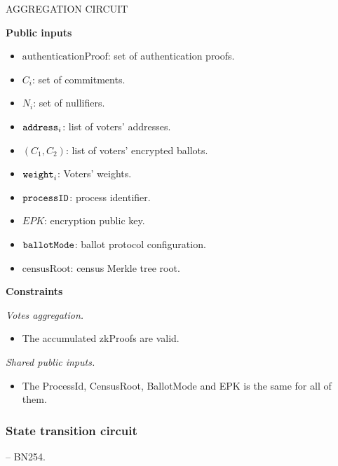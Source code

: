 \begin{mdframed}
	\begin{minipage}[H]{1\textwidth}
		\begin{spacing}{1.25}
			\vspace{0.3cm}
			\begin{center}{AGGREGATION CIRCUIT}\end{center}
			\textbf{Public inputs}
			\begin{itemize}
				\item \public $\text{authenticationProof}$: set of authentication proofs.
				\item \public $C_i$: set of commitments.
				\item \public $N_i$: set of nullifiers.		
				\item \public $\texttt{address}_i$: list of voters' addresses.
				\item \public $(C_1, C_2)$: list of voters' encrypted ballots.
				\item \public $\texttt{weight}_i$: Voters' weights.
				\item \public $\texttt{processID}$: process identifier.
				\item \public $EPK$: encryption public key.
				\item \public $\texttt{ballotMode}$: ballot protocol configuration.
				\item \public $\text{censusRoot}$: census Merkle tree root.
			\end{itemize}
			\textbf{Constraints} \\ \vspace{-0.4cm}		
			
			\emph{Votes aggregation.} 
			\begin{itemize}
				\item The accumulated zkProofs are valid.
			\end{itemize}
			\emph{Shared public inputs.}
			\begin{itemize}
				\item The ProcessId, CensusRoot, BallotMode and EPK is the same for all of them.
			\end{itemize}
			\vspace{-0.3cm}
		\end{spacing}
	\end{minipage}
\end{mdframed}

\newpage
\subsubsection{State transition circuit} -- BN254. \\

